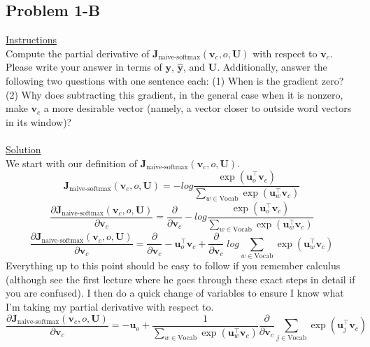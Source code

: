 \documentclass[12pt]{article}
\begin{document}
\subsection{Problem 1-B}
\underline{Instructions}
~\\
Compute the partial derivative of $\bm J_{\text{naive-softmax}}(\bm v_c, o, \bm U)$ with respect to $\bm v_c$. 
Please write your answer in terms of $\bm y$, $\hat{\bm y}$, and $\bm U$. Additionally, answer the following 
two questions with one sentence each: (1) When is the gradient zero? (2) Why does subtracting this gradient, 
in the general case when it is nonzero, make $\bm v_c$ a more desirable vector (namely, a vector closer to 
outside word vectors in its window)?
~\\
~\\
\underline{Solution}
~\\
We start with our definition of $\bm J_{\text{naive-softmax}}(\bm v_c, o, \bm U)$.
\begin{equation*}
    \bm J_{\text{naive-softmax}}(\bm v_c, o, \bm U) = 
    -log \frac{\exp(\bm u_{o}^\top \bm v_c)}{\sum_{w \in \text{Vocab}} \exp(\bm u_{w}^\top \bm v_c)}
\end{equation*}
\begin{equation*}
    \frac{\partial \bm J_{\text{naive-softmax}}(\bm v_c, o, \bm U)}{\partial \bm v_c} = 
    \frac{\partial}{\partial \bm v_c} 
    - log \frac{\exp(\bm u_{o}^\top \bm v_c)}{\sum_{w \in \text{Vocab}} \exp(\bm u_{w}^\top \bm v_c)}
\end{equation*}
\begin{equation*}
    \frac{\partial \bm J_{\text{naive-softmax}}(\bm v_c, o, \bm U)}{\partial \bm v_c} = 
    \frac{\partial}{\partial \bm v_c} 
    - \bm u_{o}^\top \bm v_c +
    \frac{\partial}{\partial \bm v_c} 
    \; log \sum_{w \in \text{Vocab}} \exp(\bm u_{w}^\top \bm v_c)
\end{equation*}
Everything up to this point should be easy to follow if you remember calculus (although see the 
first lecture where he goes through these exact steps in detail if you are confused). I then 
do a quick change of variables to ensure I know what I'm taking my partial derivative with respect to.
\begin{equation*}
    \frac{\partial \bm J_{\text{naive-softmax}}(\bm v_c, o, \bm U)}{\partial \bm v_c} = 
    - \bm u_{o} +
    \frac{1}{\sum_{w \in \text{Vocab}} \exp(\bm u_{w}^\top \bm v_c)}
    \frac{\partial}{\partial \bm v_c} 
    {\sum_{j \in \text{Vocab}} \exp(\bm u_{j}^\top \bm v_c)}
\end{equation*}
\end{document}
